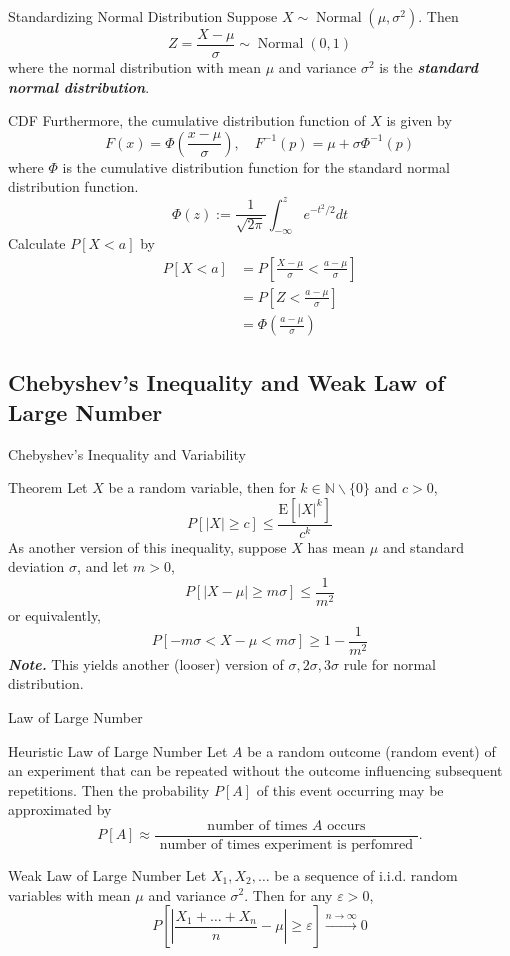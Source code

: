 \documentclass{beamer}
\newcommand{\bb}[1]{\textcolor{antiquefuchsia}{\textbf{\textit{#1}}}}
\begin{document}
\begin{frame}{Standardizing Normal Distribution}
Suppose $X \sim \operatorname{Normal}\left(\mu, \sigma^{2}\right) .$ Then
$$
Z=\frac{X-\mu}{\sigma} \sim \operatorname{Normal}(0,1)
$$
where the normal distribution with mean $\mu$ and variance $\sigma^{2}$ is the \bb{standard normal distribution}.
\end{frame}

\begin{frame}{CDF}
Furthermore, the cumulative distribution function of $X$ is given by
$$
F(x)=\Phi\left(\frac{x-\mu}{\sigma}\right), \quad F^{-1}(p)=\mu+\sigma \Phi^{-1}(p)
$$
where $\Phi$ is the cumulative distribution function for the standard normal distribution function.
$$
\Phi(z):=\frac{1}{\sqrt{2 \pi}} \int_{-\infty}^{z} e^{-t^{2} / 2} d t
$$
Calculate $P[X<a]$ by
$$
\begin{aligned}
P[X<a] &=P\left[\frac{X-\mu}{\sigma}<\frac{a-\mu}{\sigma}\right] \\
&=P\left[Z<\frac{a-\mu}{\sigma}\right] \\
&=\Phi\left(\frac{a-\mu}{\sigma}\right)
\end{aligned}
$$
\end{frame}


\subsection{Chebyshev's Inequality and Weak Law of Large Number}
\begin{frame}{Chebyshev's Inequality and Variability}
\begin{block}{Theorem}
Let $X$ be a random variable, then for $k \in \mathbb{N} \backslash\{0\}$ and $c>0$,
$$
P[|X| \geq c] \leq \frac{\mathrm{E}\left[|X|^{k}\right]}{c^{k}}
$$
As another version of this inequality, suppose $X$ has mean $\mu$ and standard deviation $\sigma$, and let $m>0$,
$$
P[|X-\mu| \geq m \sigma] \leq \frac{1}{m^{2}}
$$
or equivalently,
$$
P[-m \sigma<X-\mu<m \sigma] \geq 1-\frac{1}{m^{2}}
$$
\bb{Note.} This yields another (looser) version of $\sigma, 2 \sigma, 3 \sigma$ rule for normal distribution.
\end{block}
\end{frame}

\begin{frame}{Law of Large Number}
\begin{block}{Heuristic Law of Large Number}
Let $A$ be a random outcome (random event) of an experiment that can be repeated without the outcome influencing subsequent repetitions. Then the probability $P[A]$ of this event occurring may be approximated by
$$
P[A] \approx \frac{\text { number of times } A \text { occurs }}{\text { number of times experiment is perfomred }} .
$$
\end{block}
\begin{block}{Weak Law of Large Number}
Let $X_{1}, X_{2}, \ldots$ be a sequence of i.i.d. random variables with mean $\mu$ and variance $\sigma^{2}$. Then for any $\varepsilon>0$,
$$
P\left[\left|\frac{X_{1}+\ldots+X_{n}}{n}-\mu\right| \geq \varepsilon\right] \stackrel{n \rightarrow \infty}{\longrightarrow} 0
$$
\end{block}
\end{frame}
\end{document}
